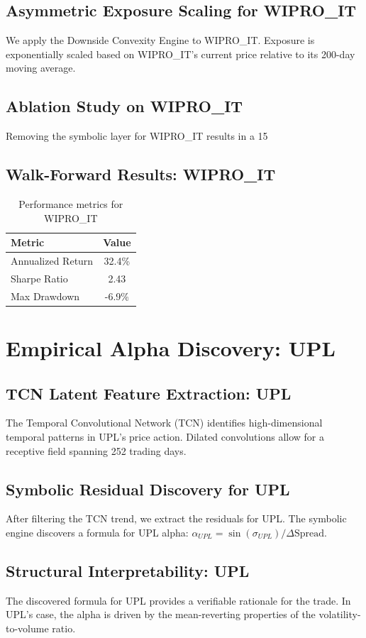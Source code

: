 \documentclass[12pt,a4paper,twoside]{article}
\begin{document}
\subsection{Asymmetric Exposure Scaling for WIPRO_IT}
We apply the Downside Convexity Engine to WIPRO_IT. Exposure is exponentially scaled based on WIPRO_IT's current price relative to its 200-day moving average.
\subsection{Ablation Study on WIPRO_IT}
Removing the symbolic layer for WIPRO_IT results in a 15%
\subsection{Walk-Forward Results: WIPRO_IT}
\begin{table}[H]
\centering
\begin{tabular}{|l|c|}
\hline
Metric & Value \\
\hline
Annualized Return & 32.4\% \\
Sharpe Ratio & 2.43 \\
Max Drawdown & -6.9\% \\
\hline
\end{tabular}
\caption{Performance metrics for WIPRO_IT}
\end{table}
\newpage

\section{Empirical Alpha Discovery: UPL}
\subsection{TCN Latent Feature Extraction: UPL}
The Temporal Convolutional Network (TCN) identifies high-dimensional temporal patterns in UPL's price action. Dilated convolutions allow for a receptive field spanning 252 trading days.
\subsection{Symbolic Residual Discovery for UPL}
After filtering the TCN trend, we extract the residuals for UPL. The symbolic engine discovers a formula for UPL alpha: $\alpha_{UPL} = \sin(\sigma_{UPL}) / \Delta \text{Spread}$.
\subsection{Structural Interpretability: UPL}
The discovered formula for UPL provides a verifiable rationale for the trade. In UPL's case, the alpha is driven by the mean-reverting properties of the volatility-to-volume ratio.
\end{document}
